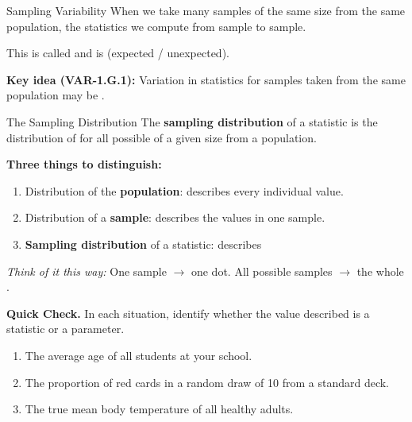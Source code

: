 \documentclass[10pt]{article}
\begin{document}
\begin{notesbox}{Sampling Variability}
When we take many samples of the same size from the same population, the statistics we
compute \blank{8cm} from sample to sample.

This is called \blank{6cm} and is \blank{3cm} (expected / unexpected).

\textbf{Key idea (VAR-1.G.1):} Variation in statistics for samples taken from the same
population may be \blank{8cm}.
\end{notesbox}

\vspace{0.1in}

\begin{notesbox}{The Sampling Distribution}
The \textbf{sampling distribution} of a statistic is the distribution of \blank{8cm}
\writeline
for all possible \blank{6cm} of a given size from a population.

\textbf{Three things to distinguish:}
\begin{enumerate}
  \item Distribution of the \textbf{population}: describes every individual value.
  \item Distribution of a \textbf{sample}: describes the values in one sample.
  \item \textbf{Sampling distribution} of a statistic: describes \writeline
\end{enumerate}

\textit{Think of it this way:} One sample $\to$ one dot. All possible samples $\to$
the whole \blank{5cm}.
\end{notesbox}

\vspace{0.1in}

\begin{practicebox}
\textbf{Quick Check.} In each situation, identify whether the value described is a
statistic or a parameter.

\begin{enumerate}
  \item The average age of all students at your school. \hfill \blank{3.5cm}
  \item The proportion of red cards in a random draw of 10 from a standard deck.
        \hfill \blank{3.5cm}
  \item The true mean body temperature of all healthy adults. \hfill \blank{3.5cm}
\end{enumerate}
\end{practicebox}
\end{document}
